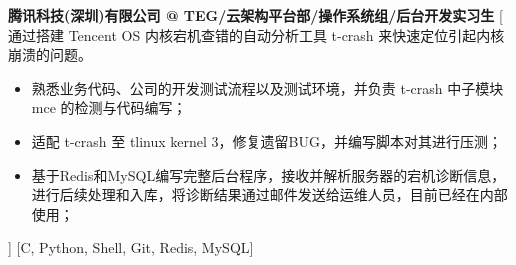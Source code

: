 \begin{experiences}
	{\textbf{腾讯科技(深圳)有限公司 @ TEG/云架构平台部/操作系统组/后台开发实习生}}%
	[
	通过搭建 Tencent OS 内核宕机查错的自动分析工具 t-crash 来快速定位引起内核崩溃的问题。
	\begin{itemize}
		\item {熟悉业务代码、公司的开发测试流程以及测试环境，并负责 t-crash 中子模块 mce 的检测与代码编写；}
		\item {适配 t-crash 至 tlinux kernel 3，修复遗留BUG，并编写脚本对其进行压测；}
		\item {基于Redis和MySQL编写完整后台程序，接收并解析服务器的宕机诊断信息，进行后续处理和入库，将诊断结果通过邮件发送给运维人员，目前已经在内部使用；}
	\end{itemize}
	]
	[C, Python, Shell, Git, Redis, MySQL]
	
\end{experiences}